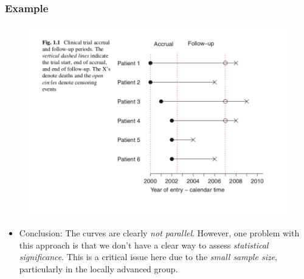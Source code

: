 \documentclass{beamer}
\newcommand{\empr}[1]{{\emph{\color{red}#1}}}
\begin{document}
\pagebreak
\begin{frame}
\frametitle{Example}
\begin{figure}
\includegraphics[scale = .35]{003.png}
\end{figure}
\begin{itemize}
\item Conclusion: The curves are clearly \empr{not parallel}. However, one problem with this approach is that we don't have a clear way to assess \empr{statistical significance}. This is a critical issue here due to the \empr{small sample size}, particularly in the locally advanced group.
\end{itemize}
\end{frame}
\end{document}
